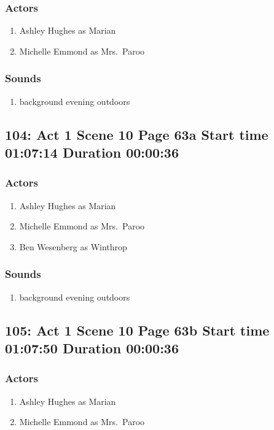 \subsubsection{Actors}
\begin{enumerate}
\item Ashley Hughes as Marian
\item Michelle Emmond as Mrs.~Paroo
\end{enumerate}

\subsubsection{Sounds}
\begin{enumerate}
\item background evening outdoors
\end{enumerate}
\subsection{104: Act 1 Scene 10 Page 63a Start time 01:07:14 Duration 00:00:36}

\subsubsection{Actors}
\begin{enumerate}
\item Ashley Hughes as Marian
\item Michelle Emmond as Mrs.~Paroo
\item Ben Wesenberg as Winthrop
\end{enumerate}

\subsubsection{Sounds}
\begin{enumerate}
\item background evening outdoors
\end{enumerate}
\subsection{105: Act 1 Scene 10 Page 63b Start time 01:07:50 Duration 00:00:36}

\subsubsection{Actors}
\begin{enumerate}
\item Ashley Hughes as Marian
\item Michelle Emmond as Mrs.~Paroo
\end{enumerate}

